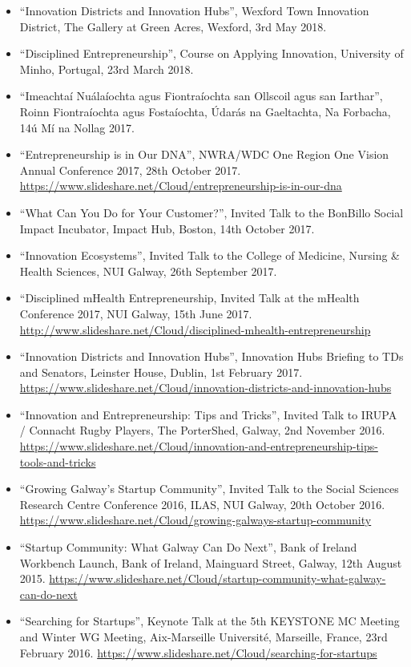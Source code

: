 \documentclass[10pt,a4paper]{res} %
\begin{document}
\begin{resume}
\begin{itemize}
\item ``Innovation Districts and Innovation Hubs'', Wexford Town Innovation District, The Gallery at Green Acres, Wexford, 3rd May 2018.
\item ``Disciplined Entrepreneurship'', Course on Applying Innovation, University of Minho, Portugal, 23rd March 2018.
\item ``Imeachta\'{i} Nu\'{a}la\'{i}ochta agus Fiontra\'{i}ochta san Ollscoil agus san Iarthar'', Roinn Fiontra\'{i}ochta agus Fosta\'{i}ochta, \'{U}dar\'{a}s na Gaeltachta, Na Forbacha, 14\'{u} M\'{i} na Nollag 2017.
\item ``Entrepreneurship is in Our DNA'', NWRA/WDC One Region One Vision Annual Conference 2017, 28th October 2017. \url{https://www.slideshare.net/Cloud/entrepreneurship-is-in-our-dna}
\item ``What Can You Do for Your Customer?'', Invited Talk to the BonBillo Social Impact Incubator, Impact Hub, Boston, 14th October 2017.
\item ``Innovation Ecosystems'', Invited Talk to the College of Medicine, Nursing \& Health Sciences, NUI Galway, 26th September 2017.
\item ``Disciplined mHealth Entrepreneurship, Invited Talk at the mHealth Conference 2017, NUI Galway, 15th June 2017. \url{http://www.slideshare.net/Cloud/disciplined-mhealth-entrepreneurship}
\item ``Innovation Districts and Innovation Hubs'', Innovation Hubs Briefing to TDs and Senators, Leinster House, Dublin, 1st February 2017. \url{https://www.slideshare.net/Cloud/innovation-districts-and-innovation-hubs}
\item ``Innovation and Entrepreneurship: Tips and Tricks'', Invited Talk to IRUPA / Connacht Rugby Players, The PorterShed, Galway, 2nd November 2016. \url{https://www.slideshare.net/Cloud/innovation-and-entrepreneurship-tips-tools-and-tricks}
\item ``Growing Galway's Startup Community'', Invited Talk to the Social Sciences Research Centre Conference 2016, ILAS, NUI Galway, 20th October 2016. \url{https://www.slideshare.net/Cloud/growing-galways-startup-community}
\item ``Startup Community: What Galway Can Do Next'', Bank of Ireland Workbench Launch, Bank of Ireland, Mainguard Street, Galway, 12th August 2015. \url{https://www.slideshare.net/Cloud/startup-community-what-galway-can-do-next}
\item ``Searching for Startups'', Keynote Talk at the 5th KEYSTONE MC Meeting and Winter WG Meeting, Aix-Marseille Universit\'{e}, Marseille, France, 23rd February 2016. \url{https://www.slideshare.net/Cloud/searching-for-startups}

\end{itemize}
\end{resume}
\end{document}
